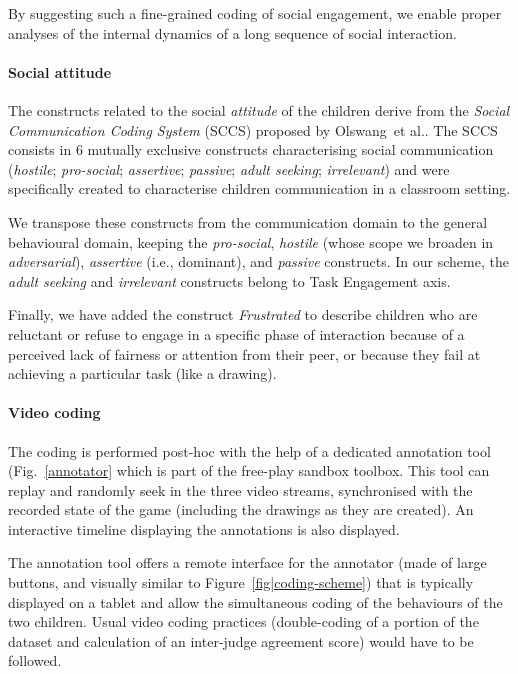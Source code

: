 \documentclass[sigconf]{acmart}
\newcommand{\etal}{et al.\xspace}
\newcommand{\ie}{i.e.,\xspace}
\begin{document}
By suggesting such a fine-grained coding of social engagement, we enable proper
analyses of the internal dynamics of a long sequence of social interaction.

\paragraph{Social attitude}

The constructs related to the social \emph{attitude} of the children derive from the
\emph{Social Communication Coding System} (SCCS) proposed by
Olswang~\etal\cite{olswang2006reliability}.  The SCCS consists in 6 mutually
exclusive constructs characterising social communication (\emph{hostile};
\emph{pro-social}; \emph{assertive}; \emph{passive}; \emph{adult seeking};
\emph{irrelevant}) and were specifically created to characterise children
communication in a classroom setting.

We transpose these constructs from the communication domain to the general
behavioural domain, keeping the \emph{pro-social}, \emph{hostile} (whose scope
we broaden in \emph{adversarial}), \emph{assertive} (\ie dominant), and
\emph{passive} constructs. In our scheme, the \emph{adult seeking} and
\emph{irrelevant} constructs belong to Task Engagement axis.

Finally, we have added the construct \emph{Frustrated} to describe children who
are reluctant or refuse to engage in a specific phase of interaction
because of a perceived lack of fairness or attention from their peer, or because
they fail at achieving a particular task (like a drawing).

\paragraph{Video coding}

The coding is performed post-hoc with the help of a dedicated annotation tool
(Fig.~\ref{annotator} which is part of the free-play sandbox toolbox. This tool
can replay and randomly seek in the three video streams, synchronised with the
recorded state of the game (including the drawings as they are created). An
interactive timeline displaying the annotations is also displayed.

The annotation tool offers a remote interface for the annotator (made of large
buttons, and visually similar to Figure~\ref{fig|coding-scheme}) that is
typically displayed on a tablet and allow the simultaneous coding of the
behaviours of the two children.  Usual video coding practices (double-coding of
a portion of the dataset and calculation of an inter-judge agreement score)
would have to be followed.
\end{document}
